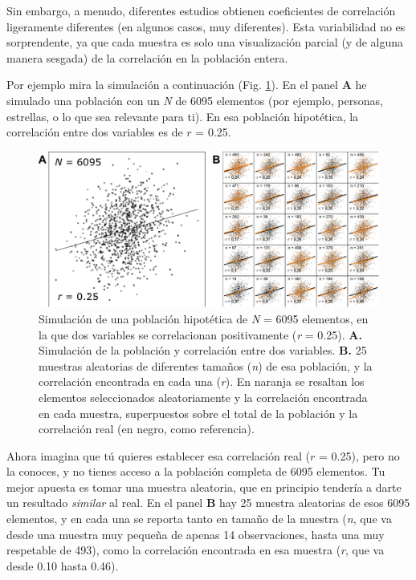 \documentclass[
  bookmarksnumbered]{article}
\begin{document}
Sin embargo, a menudo, diferentes estudios obtienen coeficientes de correlación ligeramente diferentes (en algunos casos, muy diferentes). Esta variabilidad no es sorprendente, ya que cada muestra es solo una visualización parcial (y de alguna manera sesgada) de la correlación en la población entera.

Por ejemplo mira la simulación a continuación (Fig. \ref{fig:efecto}). En el panel \textbf{A} he simulado una población con un \emph{N} de 6095 elementos (por ejemplo, personas, estrellas, o lo que sea relevante para ti). En esa población hipotética, la correlación entre dos variables es de \(r\) = 0.25.

\begin{figure}
\centering
\includegraphics{images/sim_estabilidad.pdf}
\caption{\label{fig:efecto}Simulación de una población hipotética de \emph{N} = 6095 elementos, en la que dos variables se correlacionan positivamente (\emph{r} = 0.25). \textbf{A.} Simulación de la población y correlación entre dos variables. \textbf{B.} 25 muestras aleatorias de diferentes tamaños (\emph{n}) de esa población, y la correlación encontrada en cada una (\emph{r}). En naranja se resaltan los elementos seleccionados aleatoriamente y la correlación encontrada en cada muestra, superpuestos sobre el total de la población y la correlación real (en negro, como referencia).}
\end{figure}

Ahora imagina que tú quieres establecer esa correlación real (\(r\) = 0.25), pero no la conoces, y no tienes acceso a la población completa de 6095 elementos. Tu mejor apuesta es tomar una muestra aleatoria, que en principio tendería a darte un resultado \emph{similar} al real. En el panel \textbf{B} hay 25 muestra aleatorias de esos 6095 elementos, y en cada una se reporta tanto en tamaño de la muestra (\emph{n}, que va desde una muestra muy pequeña de apenas 14 observaciones, hasta una muy respetable de 493), como la correlación encontrada en esa muestra (\emph{r}, que va desde 0.10 hasta 0.46).
\end{document}
